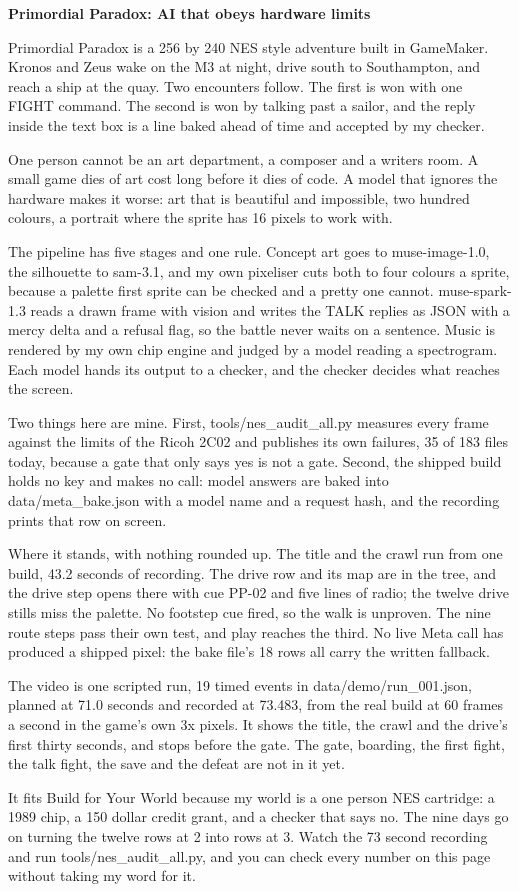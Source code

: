 \documentclass[11pt]{article}
\begin{document}
{\Large \textbf{Primordial Paradox: AI that obeys hardware limits}}

Primordial Paradox is a 256 by 240 NES style adventure built in GameMaker. Kronos and Zeus wake on the M3 at night, drive south to Southampton, and reach a ship at the quay. Two encounters follow. The first is won with one FIGHT command. The second is won by talking past a sailor, and the reply inside the text box is a line baked ahead of time and accepted by my checker.

One person cannot be an art department, a composer and a writers room. A small game dies of art cost long before it dies of code. A model that ignores the hardware makes it worse: art that is beautiful and impossible, two hundred colours, a portrait where the sprite has 16 pixels to work with.

The pipeline has five stages and one rule. Concept art goes to muse-image-1.0, the silhouette to sam-3.1, and my own pixeliser cuts both to four colours a sprite, because a palette first sprite can be checked and a pretty one cannot. muse-spark-1.3 reads a drawn frame with vision and writes the TALK replies as JSON with a mercy delta and a refusal flag, so the battle never waits on a sentence. Music is rendered by my own chip engine and judged by a model reading a spectrogram. Each model hands its output to a checker, and the checker decides what reaches the screen.

Two things here are mine. First, tools/nes\_audit\_all.py measures every frame against the limits of the Ricoh 2C02 and publishes its own failures, 35 of 183 files today, because a gate that only says yes is not a gate. Second, the shipped build holds no key and makes no call: model answers are baked into data/meta\_bake.json with a model name and a request hash, and the recording prints that row on screen.

Where it stands, with nothing rounded up. The title and the crawl run from one build, 43.2 seconds of recording. The drive row and its map are in the tree, and the drive step opens there with cue PP-02 and five lines of radio; the twelve drive stills miss the palette. No footstep cue fired, so the walk is unproven. The nine route steps pass their own test, and play reaches the third. No live Meta call has produced a shipped pixel: the bake file's 18 rows all carry the written fallback.

The video is one scripted run, 19 timed events in data/demo/run\_001.json, planned at 71.0 seconds and recorded at 73.483, from the real build at 60 frames a second in the game's own 3x pixels. It shows the title, the crawl and the drive's first thirty seconds, and stops before the gate. The gate, boarding, the first fight, the talk fight, the save and the defeat are not in it yet.

It fits Build for Your World because my world is a one person NES cartridge: a 1989 chip, a 150 dollar credit grant, and a checker that says no. The nine days go on turning the twelve rows at 2 into rows at 3. Watch the 73 second recording and run tools/nes\_audit\_all.py, and you can check every number on this page without taking my word for it.
\end{document}
